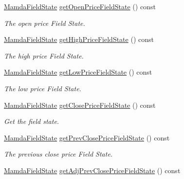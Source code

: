 \begin{CompactItemize}
\hyperlink{namespaceWombat_93aac974f2ab713554fd12a1fa3b7d2a}{Mamda\-Field\-State} \hyperlink{classWombat_1_1MamdaTradeListener_823d3caa4ea0c0c6efb7c6f0e7e2a59e}{get\-Open\-Price\-Field\-State} () const 
\begin{CompactList}\small\item\em The open price Field State. \item\end{CompactList}\item 
\hyperlink{namespaceWombat_93aac974f2ab713554fd12a1fa3b7d2a}{Mamda\-Field\-State} \hyperlink{classWombat_1_1MamdaTradeListener_2d9891182ae722a107f9b49dd5ecb559}{get\-High\-Price\-Field\-State} () const 
\begin{CompactList}\small\item\em The high price Field State. \item\end{CompactList}\item 
\hyperlink{namespaceWombat_93aac974f2ab713554fd12a1fa3b7d2a}{Mamda\-Field\-State} \hyperlink{classWombat_1_1MamdaTradeListener_5830510164c197655c2b9848a06a3e0a}{get\-Low\-Price\-Field\-State} () const 
\begin{CompactList}\small\item\em The low price Field State. \item\end{CompactList}\item 
\hyperlink{namespaceWombat_93aac974f2ab713554fd12a1fa3b7d2a}{Mamda\-Field\-State} \hyperlink{classWombat_1_1MamdaTradeListener_47222f2a6f39a3fcca3128317718cc79}{get\-Close\-Price\-Field\-State} () const 
\begin{CompactList}\small\item\em Get the field state. \item\end{CompactList}\item 
\hyperlink{namespaceWombat_93aac974f2ab713554fd12a1fa3b7d2a}{Mamda\-Field\-State} \hyperlink{classWombat_1_1MamdaTradeListener_6b5ce55994a03c95c2a4b0732f75c664}{get\-Prev\-Close\-Price\-Field\-State} () const 
\begin{CompactList}\small\item\em The previous close price Field State. \item\end{CompactList}\item 
\hyperlink{namespaceWombat_93aac974f2ab713554fd12a1fa3b7d2a}{Mamda\-Field\-State} \hyperlink{classWombat_1_1MamdaTradeListener_0df7a1c343774b3577b2e28867470ea9}{get\-Adj\-Prev\-Close\-Price\-Field\-State} () const 

\end{CompactItemize}
